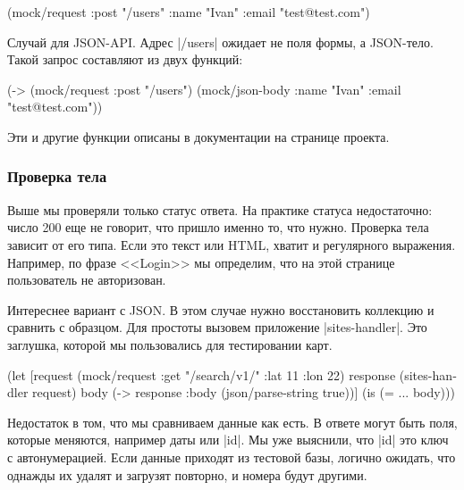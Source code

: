 \begin{english}
  \begin{clojure}
(mock/request :post "/users" {:name "Ivan" :email "test@test.com"})
  \end{clojure}
\end{english}

Случай для JSON-API. Адрес \spverb|/users| ожидает не поля формы, а
JSON-тело. Такой запрос составляют из двух функций:

\begin{english}
  \begin{clojure}
(-> (mock/request :post "/users")
    (mock/json-body {:name "Ivan" :email "test@test.com"}))
  \end{clojure}
\end{english}

Эти и другие функции описаны в документации на странице проекта.

\subsubsection*{Проверка тела}

Выше мы проверяли только статус ответа. На практике статуса недостаточно: число
200 еще не говорит, что пришло именно то, что нужно. Проверка тела зависит от
его типа. Если это текст или HTML, хватит и регулярного выражения. Например, по
фразе <<Login>> мы определим, что на этой странице пользователь не авторизован.

Интереснее вариант с JSON. В этом случае нужно восстановить коллекцию и сравнить
с образцом. Для простоты вызовем приложение \spverb|sites-handler|. Это
заглушка, которой мы пользовались для тестировании карт.

\begin{english}
  \begin{clojure}
(let [request (mock/request :get "/search/v1/" {:lat 11 :lon 22})
      response (sites-handler request)
      body (-> response :body (json/parse-string true))]
  (is (= {...} body)))
  \end{clojure}
\end{english}

Недостаток в том, что мы сравниваем данные как есть. В ответе могут быть поля,
которые меняются, например даты или \spverb|id|. Мы уже выяснили, что
\spverb|id| это ключ с автонумерацией. Если данные приходят из тестовой базы,
логично ожидать, что однажды их удалят и загрузят повторно, и номера будут
другими.

